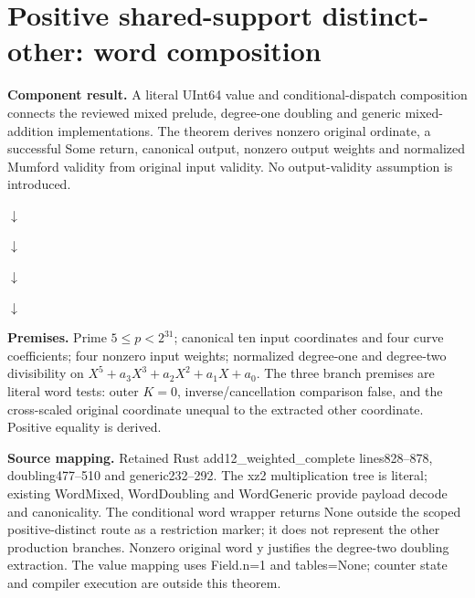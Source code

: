 \documentclass[10pt]{article}
\begin{document}
\section*{Positive shared-support distinct-other: word composition}
\textbf{Component result.} A literal UInt64 value and conditional-dispatch composition connects the reviewed mixed prelude, degree-one doubling and generic mixed-addition implementations. The theorem derives nonzero original ordinate, a successful Some return, canonical output, nonzero output weights and normalized Mumford validity from original input validity. No output-validity assumption is introduced.

\begin{center}\par $\downarrow$\par
{}\par $\downarrow$\par
{}\par $\downarrow$\par
{}\par $\downarrow$\par
{}\end{center}

\textbf{Premises.} Prime $5\le p<2^{31}$; canonical ten input coordinates and four curve coefficients; four nonzero input weights; normalized degree-one and degree-two divisibility on $X^5+a_3X^3+a_2X^2+a_1X+a_0$. The three branch premises are literal word tests: outer $K=0$, inverse/cancellation comparison false, and the cross-scaled original coordinate unequal to the extracted other coordinate. Positive equality is derived.

\textbf{Source mapping.} Retained Rust add12\_weighted\_complete lines828--878, doubling477--510 and generic232--292. The xz2 multiplication tree is literal; existing WordMixed, WordDoubling and WordGeneric provide payload decode and canonicality. The conditional word wrapper returns None outside the scoped positive-distinct route as a restriction marker; it does not represent the other production branches. Nonzero original word y justifies the degree-two doubling extraction. The value mapping uses Field.n=1 and tables=None; counter state and compiler execution are outside this theorem.
\end{document}
